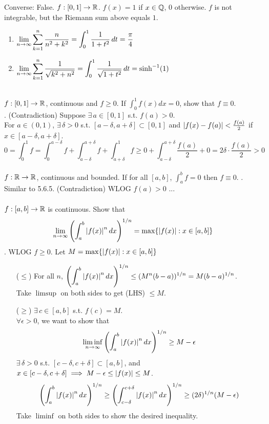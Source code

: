 Converse: False. $f:[0, 1]\rightarrow \mathbb{R}$. $f(x) = 1$ if $x\in \mathbb{Q}$, $0$ otherwise. $f$ is not integrable, but the Riemann sum above equals $1$.
\\
\prob{} 
\begin{enumerate}
	\item $\displaystyle \lim_{n\rightarrow\infty} \sum_{k=1}^n \frac{n}{n^2+k^2} = \int_0^1 \frac{1}{1+t^2}\,dt = \frac{\pi}{4}$ 
	\item $\displaystyle \lim_{n\rightarrow\infty} \sum_{k=1}^n \frac{1}{\sqrt{k^2+n^2}} = \int_0^1 \frac{1}{\sqrt{1+t^2}}\,dt = \sinh^{-1}(1)$
\end{enumerate}~\\
 $f:[0, 1]\rightarrow\mathbb{R}$, continuous and $f\geq 0$. If $\int_0^1 f(x)dx = 0$, show that $f \equiv 0$.\\
\pf. (Contradiction) Suppose $\exists\,a\in[0, 1]$ s.t. $f(a) > 0$.\\
For $a\in (0, 1)$, $\exists\,\delta > 0$ s.t. $[a-\delta, a +\delta] \subset [0, 1]$ and $\left|f(x) - f(a)\right| < \frac{f(a)}{2}$ if $x\in [a-\delta, a+\delta]$.
$$0 =\int_0^1 f = \int_0^{a-\delta} f + \int_{a-\delta}^{a+\delta} f+ \int_{a+\delta}^1 f \geq 0 + \int_{a-\delta}^{a+\delta} \frac{f(a)}{2} + 0 = 2\delta \cdot \frac{f(a)}{2} > 0$$
\\
 $f:\mathbb{R}\rightarrow\mathbb{R}$, continuous and bounded. If for all $[a, b]$, $\int_a^b f = 0$ then $f\equiv 0$.
\pf. Similar to 5.6.5. (Contradiction) WLOG $f(a) > 0$ ...\\
\\
 $f:[a, b]\rightarrow\mathbb{R}$ is continuous. Show that
$$\lim_{n\rightarrow\infty} \left(\int_a^b \left|f(x)\right|^n dx\right)^{1/n} = \max\{\left|f(x)\right|: x\in [a, b] \}$$
\pf. WLOG $f\geq 0$. Let $M = \max\{\left|f(x)\right|: x\in [a, b]\}$
\begin{enumerate}
	\item[($\leq$)] For all $n$, $\displaystyle \left(\int_a^b \left|f(x)\right|^n dx\right)^{1/n} \leq (M^n (b-a))^{1/n} = M(b-a)^{1/n}$.\\
	Take $\limsup$ on both sides to get (LHS) $\leq M$.
	\item[($\geq$)] $\exists\,c\in[a, b]$ s.t. $f(c) = M$.\\
	$\forall\epsilon > 0$, we want to show that $$\liminf_{n\rightarrow\infty} \left(\int_a^b \left|f(x)\right|^ndx\right)^{1/n} \geq M - \epsilon$$
	$\exists\,\delta >0$ s.t. $[c-\delta, c+\delta]\subset [a, b]$, and $x\in [c-\delta, c+\delta] \implies M - \epsilon \leq \left|f(x)\right| \leq M$.
	$$\left(\int_a^b \left|f(x)\right|^ndx\right)^{1/n} \geq \left(\int_{c-\delta}^{c+\delta} \left|f(x)\right|^n dx\right)^{1/n} \geq (2\delta)^{1/n} (M-\epsilon)$$
	Take $\liminf$ on both sides to show the desired inequality.
\end{enumerate}

\pagebreak